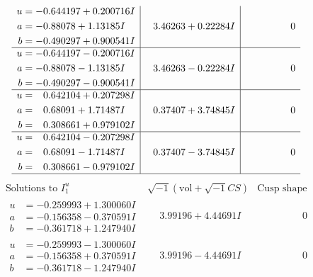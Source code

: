 \documentclass[1p]{elsarticle_modified}
\theoremstyle{definition}
\newcommand{\I}{\sqrt{-1}}
\begin{document}
$$\begin{array}{c|c|c}
\begin{aligned}
u &= -0.644197 + 0.200716 I \\
a &= -0.88078 + 1.13185 I \\
b &= -0.490297 + 0.900541 I\end{aligned}
 & \phantom{-}3.46263 + 0.22284 I & \phantom{-0.000000 } 0 \\ \hline\begin{aligned}
u &= -0.644197 - 0.200716 I \\
a &= -0.88078 - 1.13185 I \\
b &= -0.490297 - 0.900541 I\end{aligned}
 & \phantom{-}3.46263 - 0.22284 I & \phantom{-0.000000 } 0 \\ \hline\begin{aligned}
u &= \phantom{-}0.642104 + 0.207298 I \\
a &= \phantom{-}0.68091 + 1.71487 I \\
b &= \phantom{-}0.308661 + 0.979102 I\end{aligned}
 & \phantom{-}0.37407 + 3.74845 I & \phantom{-0.000000 } 0 \\ \hline\begin{aligned}
u &= \phantom{-}0.642104 - 0.207298 I \\
a &= \phantom{-}0.68091 - 1.71487 I \\
b &= \phantom{-}0.308661 - 0.979102 I\end{aligned}
 & \phantom{-}0.37407 - 3.74845 I & \phantom{-0.000000 } 0\\
 \hline 
 \end{array}$$\newpage$$\begin{array}{c|c|c}  
\text{Solutions to }I^u_{1}& \I (\text{vol} + \sqrt{-1}CS) & \text{Cusp shape}\\
 \hline 
\begin{aligned}
u &= -0.259993 + 1.300060 I \\
a &= -0.156358 - 0.370591 I \\
b &= -0.361718 + 1.247940 I\end{aligned}
 & \phantom{-}3.99196 + 4.44691 I & \phantom{-0.000000 } 0 \\ \hline\begin{aligned}
u &= -0.259993 - 1.300060 I \\
a &= -0.156358 + 0.370591 I \\
b &= -0.361718 - 1.247940 I\end{aligned}
 & \phantom{-}3.99196 - 4.44691 I & \phantom{-0.000000 } 0 \\ \hline\begin{aligned}

\end{aligned}
\end{array}$$
\end{document}
